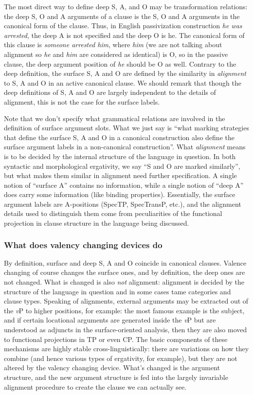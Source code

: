 \documentclass[UTF8, a4paper, oneside, scheme=plain]{ctexart}
\newcommand*{\term}[1]{\emph{#1}}
\newcommand*{\corpus}[1]{\emph{#1}}
\newcommand*{\vP}{\textit{v}P}
\begin{document}
The most direct way to define deep S, A, and O may be transformation relations: 
the deep S, O and A arguments of a clause is the S, O and A arguments in the canonical form of the clause.
Thus, in English passivization construction \corpus{he was arrested}, 
the deep A is not specified and the deep O is he. 
The canonical form of this clause is \corpus{someone arrested him}, 
where \corpus{him} 
(we are not talking about alignment so \corpus{he} and \corpus{him} are considered as identical) is O, 
so in the passive clause, 
the deep argument position of \corpus{he} should be O as well.
Contrary to the deep definition, 
the surface S, A and O are defined by the similarity in \emph{alignment} 
to S, A and O in an active canonical clause. 
We should remark that though the deep definitions of S, A and O are largely independent 
to the details of alignment, 
this is not the case for the surface labels.

Note that we don't specify what grammatical relations are involved 
in the definition of surface argument slots. 
What we just say is ``what marking strategies that define the surface S, A and O 
in a canonical construction also define the surface argument labels in a non-canonical construction''. 
What \term{alignment} means is to be decided by the internal structure of the language in question.
In both syntactic and morphological ergativity,
we say ``S and O are marked similarly'',
but what makes them similar in alignment need further specification.
A single notion of ``surface A'' contains no information,
while a single notion of ``deep A'' does carry some information
(like binding properties).
Essentially, the surface argument labels are A-positions 
(SpecTP, SpecTransP, etc.),
and the alignment details used to distinguish them come from 
peculiarities of the functional projection in clause structure in the language being discussed.

\subsubsection{What does valency changing devices do}

By definition, surface and deep S, A and O coincide in canonical clauses. 
Valence changing of course changes the surface ones,
and by definition, the deep ones are not changed. 
What is changed is also \emph{not} alignment:
alignment is decided by the structure of the language in question
and in some cases \ac{tame} categories and clause types.
Speaking of alignments, external arguments may be extracted out of the \vP{} to higher positions,
for example:
the most famous example is the subject,
and if certain locational arguments are generated inside the \vP{}
but are understood as adjuncts in the surface-oriented analysis,
then they are also moved to functional projections in TP or even CP.
The basic components of these mechanisms are highly stable cross-linguistically:
there are variations on how they combine 
(and hence various types of ergativity, for example),
but they are not altered by the valency changing device.
What's changed is the argument structure,
and the new argument structure is fed into the largely invariable alignment procedure 
to create the clause we can actually see.
\end{document}
